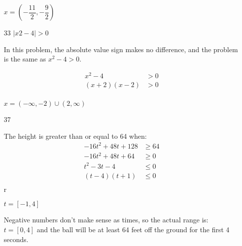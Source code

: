 \documentclass[fleqn,addpoints]{exam}
\begin{document}
\begin{itemize}
$x = \left( -\dfrac{11}{2}, -\dfrac{9}{2} \right)$

\item[33]
$|x2-4| > 0$

In this problem, the absolute value sign makes no difference, and the problem is the same as $x^2-4 > 0$.

\begin{align*}
  x^2-4 & > 0 \\
  (x+2)(x-2) &> 0 \\
\end{align*}

$x = (- \infty, -2) \cup (2, \infty)$

\item[37]

The height is greater than or equal to 64 when:
\begin{align*}
  -16t^2 + 48t + 128 &\geq 64 \\
  -16t^2 + 48t + 64 &\geq 0 \\
  t^2 -3t - 4 &\leq 0 \\
  (t-4)(t+1) &\leq 0 \\
\end{align*}r

$t = [-1, 4]$

Negative numbers don't make sense as times, so the actual range is: $t = [0, 4]$ and the ball will be at least 64 feet
off the ground for the first 4 seconds.

\end{itemize}

\pagebreak
\end{document}
